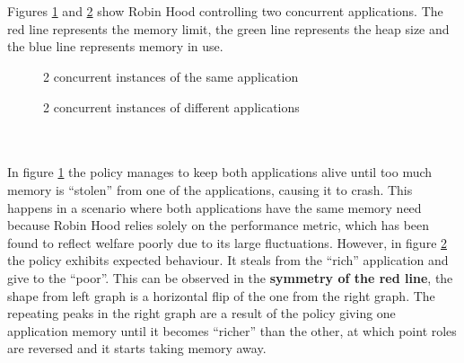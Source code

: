 \documentclass{l4proj}
\begin{document}
\\\\
\hspace*{1em} Figures \ref{robin_eq} and \ref{robin_df} show Robin Hood controlling two concurrent applications. The red line represents the memory limit, the green line represents the heap size and the blue line represents memory in use.
\begin{figure}[!ht]
\caption{2 concurrent instances of the same application}
\label{robin_eq}
\end{figure}
\begin{figure}[!ht]
\caption{2 concurrent instances of different applications}
\label{robin_df}
\end{figure}
\\\\
\hspace*{1em} In figure \ref{robin_eq} the policy manages to keep both applications alive until too much memory is ``stolen'' from one of the applications, causing it to crash. This happens in a scenario where both applications have the same memory need because Robin Hood relies solely on the performance metric, which has been found to reflect welfare poorly due to its large fluctuations. However, in figure \ref{robin_df} the policy exhibits expected behaviour. It steals from the ``rich'' application and give to the ``poor''. This can be observed in the \textbf{symmetry of the red line}, the shape from left graph is a horizontal flip of the one from the right graph. The repeating peaks in the right graph are a result of the policy giving one application memory until it becomes ``richer'' than the other, at which point roles are reversed and it starts taking memory away. 
\end{document}
